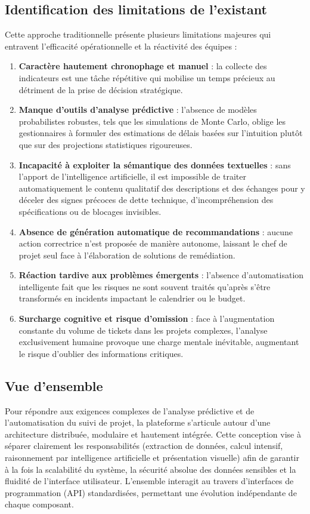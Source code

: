 \subsection{Identification des limitations de l'existant}
Cette approche traditionnelle présente plusieurs limitations majeures qui entravent l'efficacité opérationnelle et la réactivité des équipes :
\begin{enumerate}
    \item \textbf{Caractère hautement chronophage et manuel} : la collecte des indicateurs est une tâche répétitive qui mobilise un temps précieux au détriment de la prise de décision stratégique.
    \item \textbf{Manque d’outils d’analyse prédictive} : l’absence de modèles probabilistes robustes, tels que les simulations de Monte Carlo, oblige les gestionnaires à formuler des estimations de délais basées sur l’intuition plutôt que sur des projections statistiques rigoureuses.
    \item \textbf{Incapacité à exploiter la sémantique des données textuelles} : sans l’apport de l’intelligence artificielle, il est impossible de traiter automatiquement le contenu qualitatif des descriptions et des échanges pour y déceler des signes précoces de dette technique, d’incompréhension des spécifications ou de blocages invisibles.
    \item \textbf{Absence de génération automatique de recommandations} : aucune action correctrice n’est proposée de manière autonome, laissant le chef de projet seul face à l’élaboration de solutions de remédiation.
    \item \textbf{Réaction tardive aux problèmes émergents} : l’absence d’automatisation intelligente fait que les risques ne sont souvent traités qu’après s’être transformés en incidents impactant le calendrier ou le budget.
    \item \textbf{Surcharge cognitive et risque d’omission} : face à l’augmentation constante du volume de tickets dans les projets complexes, l’analyse exclusivement humaine provoque une charge mentale inévitable, augmentant le risque d’oublier des informations critiques.
\end{enumerate}


\subsection{Vue d'ensemble}
Pour répondre aux exigences complexes de l'analyse prédictive et de l'automatisation du suivi de projet, la plateforme s'articule autour d'une architecture distribuée, modulaire et hautement intégrée. Cette conception vise à séparer clairement les responsabilités (extraction de données, calcul intensif, raisonnement par intelligence artificielle et présentation visuelle) afin de garantir à la fois la scalabilité du système, la sécurité absolue des données sensibles et la fluidité de l'interface utilisateur. L'ensemble interagit au travers d'interfaces de programmation (API) standardisées, permettant une évolution indépendante de chaque composant.

